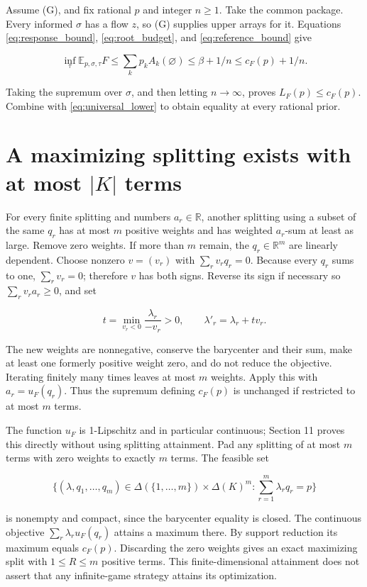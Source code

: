\documentclass[11pt,a4paper]{article}
\begin{document}
Assume (G), and fix rational \(p\) and integer \(n\ge1\). Take the common package. Every informed \(\sigma\) has a flow \(z\), so (G) supplies upper arrays for it. Equations \eqref{eq:response_bound}, \eqref{eq:root_budget}, and \eqref{eq:reference_bound} give

\[
\inf_\tau\mathbb E_{p,\sigma,\tau}F
\le\sum_kp_kA_k(\varnothing)
\le\beta+1/n\le c_F(p)+1/n.
\]

Taking the supremum over \(\sigma\), and then letting \(n\to\infty\), proves \(L_F(p)\le c_F(p)\). Combine with \eqref{eq:universal_lower} to obtain equality at every rational prior.

\section{A maximizing splitting exists with at most \texorpdfstring{\(|K|\)}{|K|} terms}

For every finite splitting and numbers \(a_r\in\mathbb R\), another splitting using a subset of the same \(q_r\) has at most \(m\) positive weights and has weighted \(a_r\)-sum at least as large. Remove zero weights. If more than \(m\) remain, the \(q_r\in\mathbb R^m\) are linearly dependent. Choose nonzero \(v=(v_r)\) with \(\sum_r v_rq_r=0\). Because every \(q_r\) sums to one, \(\sum_r v_r=0\); therefore \(v\) has both signs. Reverse its sign if necessary so \(\sum_rv_ra_r\ge0\), and set

\[
t=\min_{v_r<0}\frac{\lambda_r}{-v_r}>0,\qquad
\lambda'_r=\lambda_r+tv_r.
\]

The new weights are nonnegative, conserve the barycenter and their sum, make at least one formerly positive weight zero, and do not reduce the objective. Iterating finitely many times leaves at most \(m\) weights. Apply this with \(a_r=u_F(q_r)\). Thus the supremum defining \(c_F(p)\) is unchanged if restricted to at most \(m\) terms.

The function \(u_F\) is 1-Lipschitz and in particular continuous; Section 11 proves this directly without using splitting attainment. Pad any splitting of at most \(m\) terms with zero weights to exactly \(m\) terms. The feasible set

\[
\{(\lambda,q_1,\ldots,q_m)\in\Delta(\{1,\ldots,m\})\times\Delta(K)^m:
\sum_{r=1}^m\lambda_rq_r=p\}
\]

is nonempty and compact, since the barycenter equality is closed. The continuous objective \(\sum_r\lambda_ru_F(q_r)\) attains a maximum there. By support reduction its maximum equals \(c_F(p)\). Discarding the zero weights gives an exact maximizing split with \(1\le R\le m\) positive terms. This finite-dimensional attainment does not assert that any infinite-game strategy attains its optimization.
\end{document}
